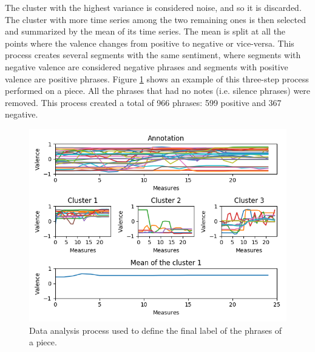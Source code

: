 The cluster with the highest variance is considered noise, and so it is discarded. The cluster with more time series among the two remaining ones is then selected and summarized by the mean of its time series. The mean is split at all the points where the valence changes from positive to negative or vice-versa. This process creates several segments with the same sentiment, where segments with negative valence are considered negative phrases and segments with positive valence are positive phrases. Figure \ref{fig:clustering} shows an example of this three-step process performed on a piece. All the phrases that had no notes (i.e. silence phrases) were removed. This process created a total of 966 phrases: 599 positive and 367 negative.

\begin{figure}[!h]
 \centering
 \includegraphics[width=\columnwidth]{imgs/ismir19/clustering.png}
 \caption{Data analysis process used to define the final label of the phrases of a piece. }
 \label{fig:clustering}
\end{figure}

%

